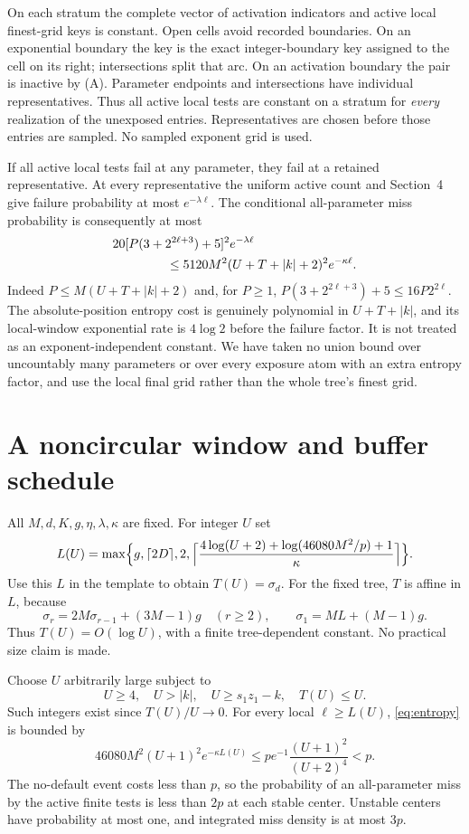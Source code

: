 \documentclass[11pt,letterpaper]{article}
\begin{document}
On each stratum the complete vector of activation indicators and active local
finest-grid keys is constant. Open cells avoid recorded boundaries. On an
exponential boundary the key is the exact integer-boundary key assigned to the
cell on its right; intersections split that arc. On an activation boundary the
pair is inactive by (A). Parameter endpoints and intersections have individual
representatives. Thus all active local tests are constant on a stratum for
\emph{every} realization of the unexposed entries. Representatives are chosen
before those entries are sampled. No sampled exponent grid is used.

If all active local tests fail at any parameter, they fail at a retained
representative. At every representative the uniform active count and Section~4
give failure probability at most $e^{-\lambda\ell}$. The conditional
all-parameter miss probability is consequently at most
\begin{align}
 &20[P(3+2^{2\ell+3})+5]^2e^{-\lambda\ell}\notag\\
 &\hspace{15mm}\le5120M^2(U+T+|k|+2)^2e^{-\kappa\ell}.       \label{eq:entropy}
\end{align}
Indeed $P\le M(U+T+|k|+2)$ and, for $P\ge1$,
$P(3+2^{2\ell+3})+5\le16P2^{2\ell}$.
The absolute-position entropy cost is genuinely polynomial in $U+T+|k|$, and
its local-window exponential rate is $4\log2$ before the failure factor.
It is not treated as an exponent-independent constant. We have taken no union
bound over uncountably many parameters or over every exposure atom with an
extra entropy factor, and use the local final grid rather than the whole
tree's finest grid.

\section{A noncircular window and buffer schedule}
All $M,d,K,g,\eta,\lambda,\kappa$ are fixed. For integer $U$ set
\begin{align*}
 L(U)=\max\Bigl\{g,\lceil2D\rceil,2,
 \Bigl\lceil\frac{4\log(U+2)+\log(46080M^2/p)+1}{\kappa}\Bigr\rceil\Bigr\}.
\end{align*}
Use this $L$ in the template to obtain $T(U)=\sigma_d$. For the fixed tree,
$T$ is affine in $L$, because
\[
 \sigma_r=2M\sigma_{r-1}+(3M-1)g\quad(r\ge2),\qquad
 \sigma_1=ML+(M-1)g.
\]
Thus $T(U)=O(\log U)$, with a finite tree-dependent constant. No practical
size claim is made.

Choose $U$ arbitrarily large subject to
\[
 U\ge4,\quad U>|k|,\quad U\ge s_1z_1-k,\quad T(U)\le U.    \tag{B}
\]
Such integers exist since $T(U)/U\to0$. For every local $\ell\ge L(U)$,
\eqref{eq:entropy} is bounded by
\[
 46080M^2(U+1)^2e^{-\kappa L(U)}
 \le p e^{-1}\frac{(U+1)^2}{(U+2)^4}<p.                    \tag{C}
\]
The no-default event costs less than $p$, so the probability of an all-parameter
miss by the active finite tests is less than $2p$ at each stable center.
Unstable centers have probability at most one, and integrated miss density is
at most $3p$.
\end{document}
